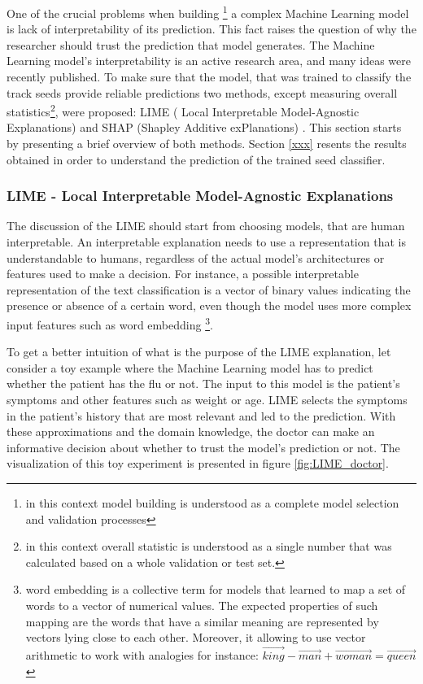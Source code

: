 One of the crucial problems when building \footnote{in this context model building is understood as a complete model selection and validation processes} a complex Machine Learning model is lack of interpretability of its prediction. This fact raises the question of why the researcher should trust the prediction that model generates. The Machine Learning model's interpretability is an active research area, and many ideas were recently published. To make sure that the model, that was trained to classify the track seeds provide reliable predictions two methods, except measuring overall statistics\footnote{in this context overall statistic is understood as a single number that was calculated based on a whole validation or test set.}, were proposed: LIME ( Local Interpretable Model-Agnostic Explanations) \cite{lime}  and SHAP (Shapley Additive exPlanations) \cite{shap}. This section starts by presenting a brief overview of both methods.  Section \ref{xxx} resents the results obtained in order to understand the prediction of the trained seed classifier.
\subsubsection{LIME - Local Interpretable Model-Agnostic Explanations }

The discussion of the LIME should start from choosing models, that are human interpretable. An interpretable explanation needs to use a representation that is understandable to humans, regardless of the actual model's architectures or features used to make a decision. For instance, a possible interpretable representation of the text classification is a vector of binary values indicating the presence or absence of a certain word, even though the model uses more complex input features such as word embedding
\footnote{word embedding is a collective term for models that learned to map a set of words to a vector of numerical values. The expected properties of such mapping are the words that have a similar meaning are represented by vectors lying close to each other. Moreover, it allowing to use vector arithmetic to work with analogies for instance: $\overrightarrow{king} - \overrightarrow{man} + \overrightarrow{woman}= \overrightarrow{queen}$}. 

To get a better intuition of what is the purpose of the LIME explanation, let consider a toy example where the Machine Learning model has to predict whether the patient has the flu or not. The input to this model is the patient's symptoms and other features such as weight or age. LIME selects the symptoms in the patient's history that are most relevant and led to the prediction. With these approximations and the domain knowledge, the doctor can make an informative decision about whether to trust the model's prediction or not. The visualization of this toy experiment is presented in figure \ref{fig:LIME_doctor}.

